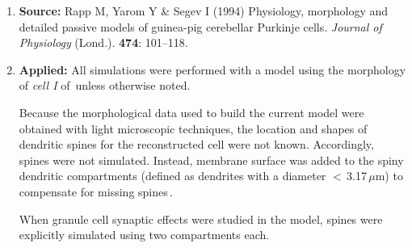 \documentclass[12pt]{article}
\begin{document}
\begin{enumerate}

   \item {\bf Source:} Rapp M, Yarom Y \& Segev I (1994) Physiology, morphology and detailed passive models of guinea-pig cerebellar Purkinje cells. {\it Journal of Physiology} (Lond.). {\bf 474}: 101--118.

   \item {\bf Applied:} All simulations were performed with a model using the morphology of {\it cell I} of\,\cite{Rapp-P:1994qf} unless otherwise noted.

Because the morphological data used to build the current model were obtained with light microscopic techniques, the location and shapes of dendritic spines for the reconstructed cell were not known. Accordingly, spines were not simulated. Instead, membrane surface was added to the spiny dendritic compartments (defined as dendrites with a
diameter $<$\,3.17\,$\mu$m) to compensate for missing spines\,\cite{R:1989cr, Rapp-M:1992kx}.

When granule cell synaptic effects were studied in the model, spines were explicitly simulated using two compartments each.

\end{enumerate}



\end{document}
